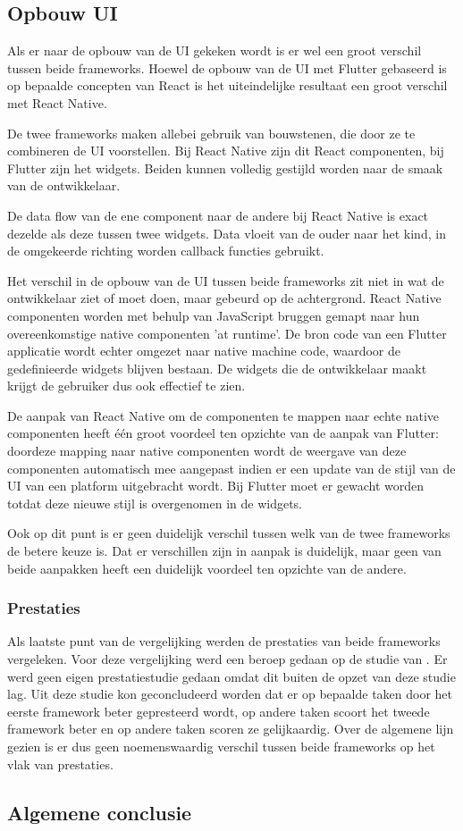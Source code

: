 \subsection{Opbouw UI}

Als er naar de opbouw van de UI gekeken wordt is er wel een groot verschil tussen beide frameworks. Hoewel de opbouw van de UI met Flutter gebaseerd is op bepaalde concepten van React is het uiteindelijke resultaat een groot verschil met React Native.

De twee frameworks maken allebei gebruik van bouwstenen, die door ze te combineren de UI voorstellen. Bij React Native zijn dit React componenten, bij Flutter zijn het widgets. Beiden kunnen volledig gestijld worden naar de smaak van de ontwikkelaar. 

De data flow van de ene component naar de andere bij React Native is exact dezelde als deze tussen twee widgets. Data vloeit van de ouder naar het kind, in de omgekeerde richting worden callback functies gebruikt.

Het verschil in de opbouw van de UI tussen beide frameworks zit niet in wat de ontwikkelaar ziet of moet doen, maar gebeurd op de achtergrond. React Native componenten worden met behulp van JavaScript bruggen gemapt naar hun overeenkomstige native componenten 'at runtime'. De bron code van een Flutter applicatie wordt echter omgezet naar native machine code, waardoor de gedefinieerde widgets blijven bestaan. De widgets die de ontwikkelaar maakt krijgt de gebruiker dus ook effectief te zien. 

De aanpak van React Native om de componenten te mappen naar echte native componenten heeft één groot voordeel ten opzichte van de aanpak van Flutter: doordeze mapping naar native componenten wordt de weergave van deze componenten automatisch mee aangepast indien er een update van de stijl van de UI van een platform uitgebracht wordt. Bij Flutter moet er gewacht worden totdat deze nieuwe stijl is overgenomen in de widgets. 

Ook op dit punt is er geen duidelijk verschil tussen welk van de twee frameworks de betere keuze is. Dat er verschillen zijn in aanpak is duidelijk, maar geen van beide aanpakken heeft een duidelijk voordeel ten opzichte van de andere. 

\subsubsection{Prestaties}

Als laatste punt van de vergelijking werden de prestaties van beide frameworks vergeleken. Voor deze vergelijking werd een beroep gedaan op de studie van \textcite{Fentaw2020}. Er werd geen eigen prestatiestudie gedaan omdat dit buiten de opzet van deze studie lag. Uit deze studie kon geconcludeerd worden dat er op bepaalde taken door het eerste framework beter gepresteerd wordt, op andere taken scoort het tweede framework beter en op andere taken scoren ze gelijkaardig. Over de algemene lijn gezien is er dus geen noemenswaardig verschil tussen beide frameworks op het vlak van prestaties.

\subsection{Algemene conclusie}
\label{sec:AlgemeneConclusie}





